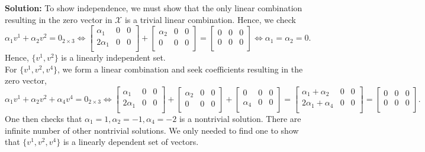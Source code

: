 \textbf{Solution:}
To show independence, we must show that the only linear combination resulting in the zero vector in $\mathcal{X}$ is a trivial linear combination. Hence, we check
$$  \alpha_1v^1+\alpha_2v^2=0_{2 \times 3}\iff\begin{bmatrix}
    \alpha_1 & 0 & 0\\
    2\alpha_1 & 0 & 0\\
    \end{bmatrix} + \begin{bmatrix}
    \alpha_2 & 0 & 0\\
    0 & 0 & 0\\
    \end{bmatrix} = \begin{bmatrix}
    0 & 0 & 0\\
    0 & 0 & 0\\
    \end{bmatrix} 
    \iff\alpha_1=\alpha_2=0.$$
    Hence, $\{v^1,v^2\}$ is a linearly independent set.\\
    
For $\{v^1,v^2, v^4\}$, we form a linear combination and seek coefficients resulting in the zero vector, 
    $$\alpha_1v^1+\alpha_2v^2+\alpha_4v^4=0_{2 \times 3}  \iff \begin{bmatrix}
    \alpha_1 & 0 & 0\\
    2\alpha_1 & 0 & 0\\
    \end{bmatrix} + \begin{bmatrix}
    \alpha_2 & 0 & 0\\
    0 & 0 & 0\\
    \end{bmatrix} + \begin{bmatrix}
    0 & 0 & 0\\
    \alpha_4 & 0 & 0\\
    \end{bmatrix}=  \begin{bmatrix}
    \alpha_1 + \alpha_2 & 0 & 0\\
    2\alpha_1 + \alpha_4& 0 & 0\\
    \end{bmatrix} = \begin{bmatrix}
    0 & 0 & 0\\
    0 & 0 & 0\\
    \end{bmatrix}.$$
One then checks that $\alpha_1=1, \alpha_2=-1, \alpha_4=-2$ is a nontrivial solution. There are infinite number of other nontrivial solutions. We only needed to find one to show that $\{v^1,v^2, v^4\}$ is a linearly dependent set of vectors.

